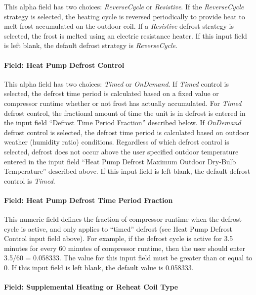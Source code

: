 This alpha field has two choices: \emph{ReverseCycle} or \emph{Resistive}. If the \emph{ReverseCycle} strategy is selected, the heating cycle is reversed periodically to provide heat to melt frost accumulated on the outdoor coil. If a \emph{Resistive} defrost strategy is selected, the frost is melted using an electric resistance heater. If this input field is left blank, the default defrost strategy is \emph{ReverseCycle}.

\paragraph{Field: Heat Pump Defrost Control}\label{field-heat-pump-defrost-control-2}

This alpha field has two choices: \emph{Timed} or \emph{OnDemand}. If \emph{Timed} control is selected, the defrost time period is calculated based on a fixed value or compressor runtime whether or not frost has actually accumulated. For \emph{Timed} defrost control, the fractional amount of time the unit is in defrost is entered in the input field ``Defrost Time Period Fraction'' described below. If \emph{OnDemand} defrost control is selected, the defrost time period is calculated based on outdoor weather (humidity ratio) conditions. Regardless of which defrost control is selected, defrost does not occur above the user specified outdoor temperature entered in the input field ``Heat Pump Defrost Maximum Outdoor Dry-Bulb Temperature'' described above. If this input field is left blank, the default defrost control is \emph{Timed}.

\paragraph{Field: Heat Pump Defrost Time Period Fraction}\label{field-heat-pump-defrost-time-period-fraction-2}

This numeric field defines the fraction of compressor runtime when the defrost cycle is active, and only applies to ``timed'' defrost (see Heat Pump Defrost Control input field above). For example, if the defrost cycle is active for 3.5 minutes for every 60 minutes of compressor runtime, then the user should enter 3.5/60 = 0.058333. The value for this input field must be greater than or equal to 0. If this input field is left blank, the default value is 0.058333.

\paragraph{Field: Supplemental Heating or Reheat Coil Type}\label{field-supplemental-heating-or-reheat-coil-type}


